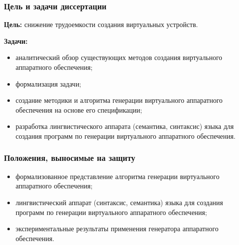 \begin{frame}%
    \frametitle{Цель и задачи диссертации}
    \textbf{Цель:} снижение трудоемкости создания виртуальных устройств.

    \textbf{Задачи:}
    \begin{itemize}
        \item аналитический обзор существующих методов создания виртуального аппаратного обеспечения;
        \item формализация задачи;
        \item создание методики и алгоритма генерации виртуального аппаратного обеспечения на основе его спецификации;
        \item разработка лингвистического аппарата (семантика, синтаксис) языка для создания программ по генерации виртуального
            аппаратного обеспечения.
    \end{itemize}
\end{frame}


\begin{frame}%
    \frametitle{Положения, выносимые на защиту}
    \begin{itemize}
        \item формализованное представление алгоритма генерации виртуального аппаратного обеспечения;
        \item лингвистический аппарат (синтаксис, семантика) языка для создания программ по генерации виртуального
            аппаратного обеспечения;
        \item экспериментальные результаты применения генератора аппаратного обеспечения.
    \end{itemize}
\end{frame}


